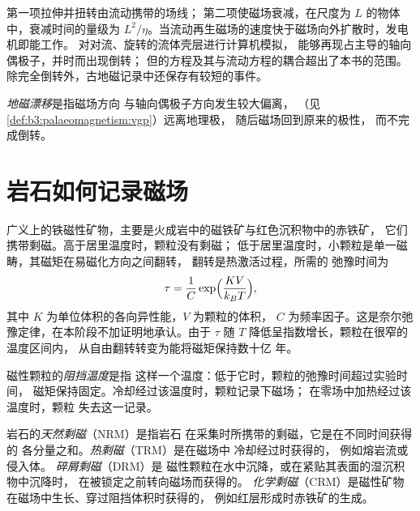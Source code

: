 第一项拉伸并扭转由流动携带的场线；
第二项使磁场衰减，在尺度为 $L$ 的物体中，衰减时间的量级为
$L^2/\eta$。当流动再生磁场的速度快于磁场向外扩散时，发电机即能工作。
对对流、旋转的流体壳层进行计算机模拟，
能够再现占主导的轴向偶极子，并时而出现倒转；
但的方程及其与流动方程的耦合超出了本书的范围。
除完全倒转外，古地磁记录中还保存有较短的事件。

\begin{definition}[地磁漂移]\label{def:b3:palaeomagnetism:excursion}
\emph{地磁漂移}是指磁场方向
与轴向偶极子方向发生较大偏离，
（见\cref{def:b3:palaeomagnetism:vgp}）远离地理极，
随后磁场回到原来的极性，
而不完成倒转。
\end{definition}

\section{岩石如何记录磁场}

广义上的铁磁性矿物，主要是火成岩中的磁铁矿与红色沉积物中的赤铁矿，
它们携带剩磁。高于居里温度时，颗粒没有剩磁；
低于居里温度时，小颗粒是单一磁畴，其磁矩在易磁化方向之间翻转，
翻转是热激活过程，所需的
弛豫时间为
\[
  \tau = \frac1C\exp\Bigl(\frac{K V}{k_B T}\Bigr),
\]
其中 $K$ 为单位体积的各向异性能，$V$ 为颗粒的体积，
$C$ 为频率因子。这是奈尔弛豫定律，在本阶段不加证明地承认。由于
$\tau$ 随 $T$ 降低呈指数增长，颗粒在很窄的温度区间内，
从自由翻转转变为能将磁矩保持数十亿
年。

\begin{definition}[阻挡温度]\label{def:b3:palaeomagnetism:blocking}
磁性颗粒的\emph{阻挡温度}是指
这样一个温度：低于它时，颗粒的弛豫时间超过实验时间，
磁矩保持固定。冷却经过该温度时，颗粒记录下磁场；
在零场中加热经过该温度时，颗粒
失去这一记录。
\end{definition}

\begin{definition}\label{def:b3:palaeomagnetism:nrm}
岩石的\emph{天然剩磁}（NRM）是指岩石
在采集时所携带的剩磁，它是在不同时间获得的
各分量之和。\emph{热剩磁}（TRM）是在磁场中
冷却经过时获得的，
例如熔岩流或侵入体。
\emph{碎屑剩磁}（DRM）是
磁性颗粒在水中沉降，或在紧贴其表面的湿沉积物中沉降时，
在被锁定之前转向磁场而获得的。
\emph{化学剩磁}（CRM）是磁性矿物
在磁场中生长、穿过阻挡体积时获得的，
例如红层形成时赤铁矿的生成。
\end{definition}

